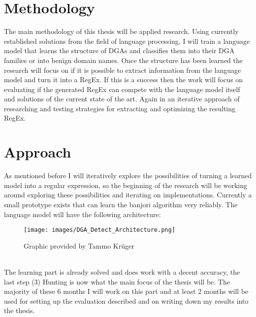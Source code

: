 \documentclass[a4paper, 12pt]{article}
\begin{document}
\section{Methodology}
The main methodology of this thesis will be applied research. Using currently established solutions
from the field of language processing, I will train a language model that learns the structure of
DGAs and classifies them into their DGA families or into benign domain names. Once the structure has
been learned the research will focus on if it is possible to extract information from the language
model and turn it into a RegEx. If this is a success then the work will focus on evaluating if the
generated RegEx can compete with the language model itself and solutions of the current state of the
art. Again in an iterative approach of researching and testing strategies for extracting and
optimizing the resulting RegEx.

\section{Approach}
As mentioned before I will iteratively explore the possibilities of turning a learned model into a
regular expression, so the beginning of the research will be working around exploring these
possibilities and iterating on implementations. Currently a small prototype exists that can learn
the banjori algorithm very reliably. 
The language model will have the following architecture:\\
\begin{figure}[h]
    \texttt{[image: images/DGA\_Detect\_Architecture.png]}
    \caption{Graphic provided by Tammo Kr\"uger}
\end{figure}\\
The learning part is already solved and does work with a decent accuracy, the last step (3) Hunting
is now what the main focus of the thesis will be. The majority of these 6 months I will work on this
part and at least 2 months will be used for setting up the evaluation described and on writing down
my results into the thesis.
\end{document}

